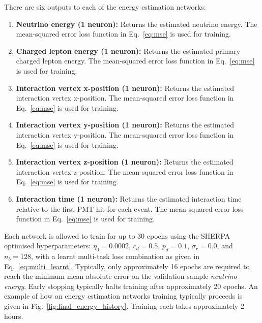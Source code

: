 There are six outputs to each of the energy estimation networks:
\begin{enumerate}
    \item \textbf{Neutrino energy (1 neuron):} Returns the estimated neutrino energy. The
          mean-squared error loss function in Eq.~\ref{eq:mse} is used for training.
    \item \textbf{Charged lepton energy (1 neuron):} Returns the estimated primary charged lepton
          energy. The mean-squared error loss function in Eq.~\ref{eq:mse} is used for training.
    \item \textbf{Interaction vertex x-position (1 neuron):} Returns the estimated interaction
          vertex x-position. The mean-squared error loss function in Eq.~\ref{eq:mse} is used for
          training.
    \item \textbf{Interaction vertex y-position (1 neuron):} Returns the estimated interaction
          vertex y-position. The mean-squared error loss function in Eq.~\ref{eq:mse} is used for
          training.
    \item \textbf{Interaction vertex z-position (1 neuron):} Returns the estimated interaction
          vertex z-position. The mean-squared error loss function in Eq.~\ref{eq:mse} is used for
          training.
    \item \textbf{Interaction time (1 neuron):} Returns the estimated interaction time relative to
          the first PMT hit for each event. The mean-squared error loss function in
          Eq.~\ref{eq:mse} is used for training.
\end{enumerate}

Each network is allowed to train for up to 30 epochs using the SHERPA optimised hyperparameters:
$\eta_{0}=0.0002$, $c_{d}=0.5$, $p_{d}=0.1$, $\sigma_{r}=0.0$, and $n_{b}=128$, with a learnt
multi-task loss combination as given in Eq.~\ref{eq:multi_learnt}. Typically, only approximately
16 epochs are required to reach the minimum mean absolute error on the validation sample
\emph{neutrino energy}. Early stopping typically halts training after approximately 20 epochs. An
example of how an energy estimation networks training typically proceeds is given in
Fig.~\ref{fig:final_energy_history}. Training each takes approximately 2 hours.

